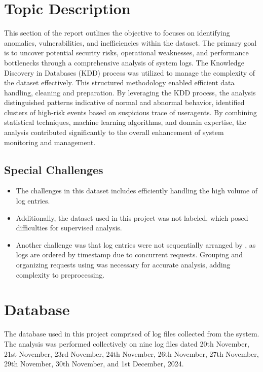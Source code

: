 \section{Topic Description}
This section of the report outlines the objective to focuses on identifying anomalies, vulnerabilities, and inefficiencies within the dataset. The primary goal is to uncover potential security risks, operational weaknesses, and performance bottlenecks through a comprehensive analysis of system logs.
The Knowledge Discovery in Databases (KDD) process was utilized to manage the complexity of the dataset effectively. This structured methodology enabled efficient data handling, cleaning and preparation. By leveraging the KDD process, the analysis distinguished patterns indicative of normal and abnormal behavior, identified clusters of high-risk events based on suspicious trace of useragents.
By combining statistical techniques, machine learning algorithms, and domain expertise, the analysis contributed significantly to the overall enhancement of system monitoring and management.

\subsection{Special Challenges}

\begin{itemize}
	\item The challenges in this dataset includes efficiently handling the high volume of log entries.
	\item  Additionally, the dataset used in this project was not labeled, which posed difficulties for supervised analysis.
	\item Another challenge was that log entries were not sequentially arranged by , as logs are ordered by timestamp due to concurrent requests. Grouping and organizing requests using  was necessary for accurate analysis, adding complexity to preprocessing.
	
\end{itemize}

\section{Database}

The database used in this project comprised of log files collected from the system. The analysis was performed collectively on nine log files dated 20th November, 21st November, 23rd November, 24th November, 26th November, 27th November, 29th November, 30th November, and 1st December, 2024.


